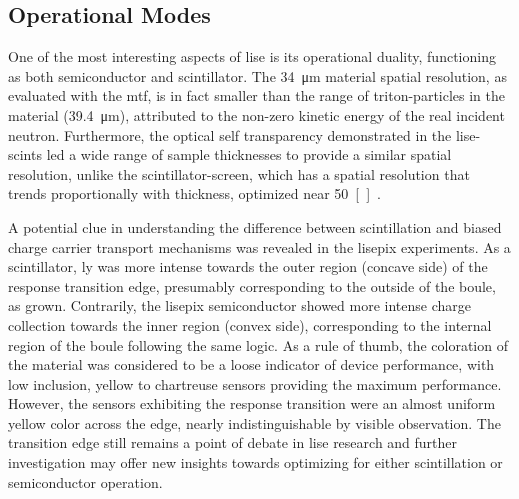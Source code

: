 \documentclass[../../../main.tex]{subfiles}%
\begin{document}
%
    \subsection{Operational Modes}%
    \label{sec:chapter-5:outcomes:operational-modes}%
    One of the most interesting aspects of \gls{lise} is its operational duality, functioning as both semiconductor and scintillator.
    The \SI{34}{\micro\meter} material spatial resolution, as evaluated with the \gls{mtf}, is in fact smaller than the range of \glspl{triton-particle} in the material (\SI{39.4}{\micro\meter}), attributed to the non-zero kinetic energy of the real incident neutron.
    Furthermore, the optical self transparency demonstrated in the \glspl{lise-scint} led a wide range of sample thicknesses to provide a similar spatial resolution, unlike the \gls{scintillator-screen}, which has a spatial resolution that trends proportionally with thickness, optimized near \SI{50}[~]{\micro\meter}.
    \par%
    A potential clue in understanding the difference between scintillation and biased charge carrier transport mechanisms was revealed in the \gls{lisepix} experiments.
    As a scintillator, \gls{ly} was more intense towards the outer region (concave side) of the response transition edge, presumably corresponding to the outside of the boule, as grown.
    Contrarily, the \gls{lisepix} semiconductor showed more intense charge collection towards the inner region (convex side), corresponding to the internal region of the boule following the same logic.
    As a rule of thumb, the coloration of the material was considered to be a loose indicator of device performance, with low inclusion, yellow to chartreuse sensors providing the maximum performance.
    However, the sensors exhibiting the response transition were an almost uniform yellow color across the edge, nearly indistinguishable by visible observation.
    The transition edge still remains a point of debate in \gls{lise} research and further investigation may offer new insights towards optimizing for either scintillation or semiconductor operation.
\end{document}
